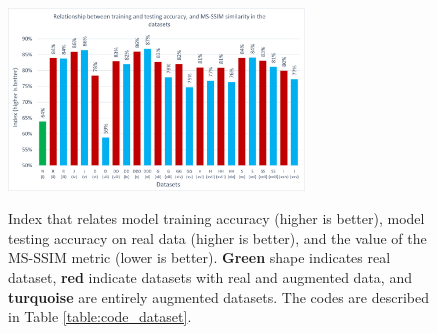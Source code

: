 \documentclass[journal]{IEEEtran}
\begin{document}
\begin{figure}
\centering
{\includegraphics[width=0.7\textwidth,keepaspectratio]{img/relation_index.png}}
\caption{Index that relates model training accuracy (higher is better), model testing accuracy on real data (higher is better), and the value of the MS-SSIM metric (lower is better). \textcolor{dotgreen}{\textbf{Green}} shape indicates real dataset, \textcolor{dotred}{\textbf{red}} indicate datasets with real and augmented data, and \textcolor{dotsky}{\textbf{turquoise}} are entirely augmented datasets. The codes are described in Table \ref{table:code_dataset}.}
\label{fig:relation_index}
\end{figure}
\end{document}
